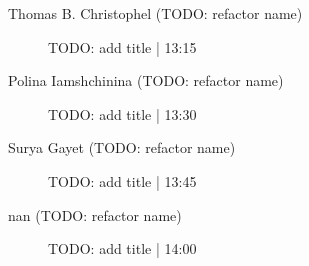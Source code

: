 \begin{symposium}
\begin{description}
                \item [Thomas B. Christophel (TODO: refactor name)] TODO: add title \textcolor{mygray}{ | 13:15}    
                
                \item [Polina Iamshchinina (TODO: refactor name)] TODO: add title \textcolor{mygray}{ | 13:30}    
                
                \item [Surya Gayet (TODO: refactor name)] TODO: add title \textcolor{mygray}{ | 13:45}    
                
                \item [nan (TODO: refactor name)] TODO: add title \textcolor{mygray}{ | 14:00}    
                
            \end{description} 
            \end{symposium}
            